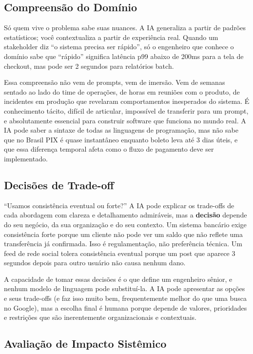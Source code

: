 \subsection{Compreensão do Domínio}

Só quem vive o problema sabe suas nuances. A IA generaliza a partir de
padrões estatísticos; você contextualiza a partir de experiência real.
Quando um stakeholder diz ``o sistema precisa ser rápido'', só o engenheiro
que conhece o domínio sabe que ``rápido'' significa latência p99 abaixo de
200ms para a tela de checkout, mas pode ser 2 segundos para relatórios
batch.

Essa compreensão não vem de prompts, vem de imersão. Vem de semanas sentado ao lado
do time de operações, de horas em reuniões com o produto, de incidentes em produção
que revelaram comportamentos inesperados do sistema. É conhecimento tácito, difícil
de articular, impossível de transferir para um prompt, e absolutamente essencial para
construir software que funciona no mundo real. A IA pode saber a sintaxe de todas as
linguagens de programação, mas não sabe que no Brasil PIX é quase instantâneo enquanto
boleto leva até 3 dias úteis, e que essa diferença temporal afeta como
o fluxo de pagamento deve ser implementado.

\subsection{Decisões de Trade-off}

``Usamos consistência eventual ou forte?'' A IA pode explicar os trade-offs
de cada abordagem com clareza e detalhamento admiráveis, mas a \textbf{decisão}
depende do seu negócio, da sua organização e do seu contexto. Um sistema
bancário exige consistência forte porque um cliente não pode ver um saldo que
não reflete uma transferência já confirmada. Isso é regulamentação, não
preferência técnica. Um feed de rede social tolera consistência eventual porque
um post que aparece 3 segundos depois para outro usuário não causa nenhum dano.

A capacidade de tomar essas decisões é o que define um engenheiro sênior, e nenhum
modelo de linguagem pode substituí-la. A IA pode apresentar as opções e seus
trade-offs (e faz isso muito bem, frequentemente melhor do que uma busca no Google),
mas a escolha final é humana porque depende de valores, prioridades e restrições
que são inerentemente organizacionais e contextuais.

\subsection{Avaliação de Impacto Sistêmico}

